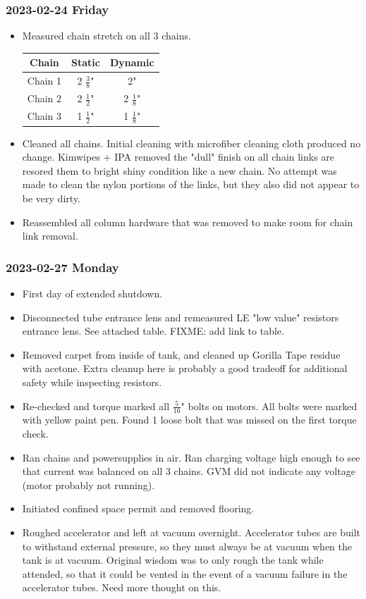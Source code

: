 \documentclass{scrartcl}
\begin{document}
\subsubsection{2023-02-24 Friday}
\begin{itemize}
	\item Measured chain stretch on all 3 chains.
	\begin{center}
		\def\arraystretch{1.3}
		\begin{tabular}{ |c|c|c| }
			\hline
			Chain & Static & Dynamic \\
			\hline
			Chain 1 & 2 \(\frac{3}{8}\)" & 2" \\
			Chain 2 & 2 \(\frac{1}{2}\)" & 2 \(\frac{1}{8}\)" \\
			Chain 3 & 1 \(\frac{1}{2}\)" & 1 \(\frac{1}{8}\)" \\
			\hline
		\end{tabular}
	\end{center}
	\item Cleaned all chains.  Initial cleaning with microfiber cleaning
	cloth produced no change.  Kimwipes + IPA removed the "dull" finish
	on all chain links are resored them to bright shiny condition like 
	a new chain.  No attempt was made to clean the nylon portions of the
	links, but they also did not appear to be very dirty.
	\item Reassembled all column hardware that was removed to make room
	for chain link removal.  
\end{itemize}

\subsubsection{2023-02-27 Monday}
\begin{itemize}
	\item First day of extended shutdown.  
	\item Disconnected tube entrance lens and remeasured LE "low 
	value" resistors entrance lens.  See attached table. 
	FIXME: add link to table.
	\item Removed carpet from inside of tank, and cleaned up Gorilla
	Tape residue with acetone.  Extra cleanup here is probably a good
	tradeoff for additional safety while inspecting resistors.
	\item Re-checked and torque marked all \(\frac{5}{16}\)" bolts on 
	motors.  All bolts were marked with yellow paint pen.  Found 1 loose
	bolt that was missed on the first torque check.
	\item Ran chains and powersupplies in air.  Ran charging voltage
	high enough to see that current was balanced on all 3 chains. 
	GVM did not indicate any voltage (motor probably not running).
	\item Initiated confined space permit and removed flooring.
	\item Roughed accelerator and left at vacuum overnight.  Accelerator
	tubes are built to withstand external pressure, so they must always be
	at vacuum when the tank is at vacuum.  Original wisdom was to only
	rough the tank while attended, so that it could be vented in the event
	of a vacuum failure in the accelerator tubes.  Need more thought on
	this.
\end{itemize}
\end{document}
